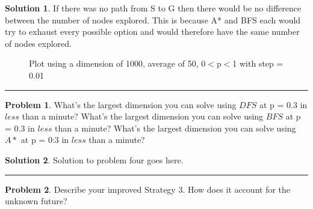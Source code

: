 \documentclass{article}
\theoremstyle{definition}
\newtheorem{problem}{Problem}
\def\fline{\rule{0.75\linewidth}{0.5pt}}
\newcommand{\finishline}{\vspace{-15pt}\begin{center}\fline\end{center}}
\newtheorem*{solution*}{Solution}
\newenvironment{solution}{\begin{solution*}}{{\finishline} \end{solution*}}
\begin{document}
\begin{solution}
    If there was no path from S to G then there would be no difference between the number of nodes explored. This is because A* and BFS each would try to exhaust every possible option and would therefore have the same number of nodes explored.
    
	\begin{figure}[h]
	\centering
	\caption{Plot using a dimension of 1000, average of 50, 0$<$p$<$1 with step = 0.01}
	\end{figure}
	
\end{solution}

\smallskip

\begin{problem}
	What's the largest dimension you can solve using $DFS$ at p = 0.3 in $less$ than a minute? What's the largest dimension you can solve using $BFS$ at p = 0.3 in $less$ than a minute? What's the largest dimension you can solve using $A*$ at p = 0:3 in $less$ than a minute?  
\end{problem}

\smallskip

\begin{solution}
	Solution to problem four goes here. 
\end{solution}

\smallskip

\begin{problem}
	Describe your improved Strategy 3. How does it account for the unknown future?
\end{problem}

\smallskip
\end{document}
